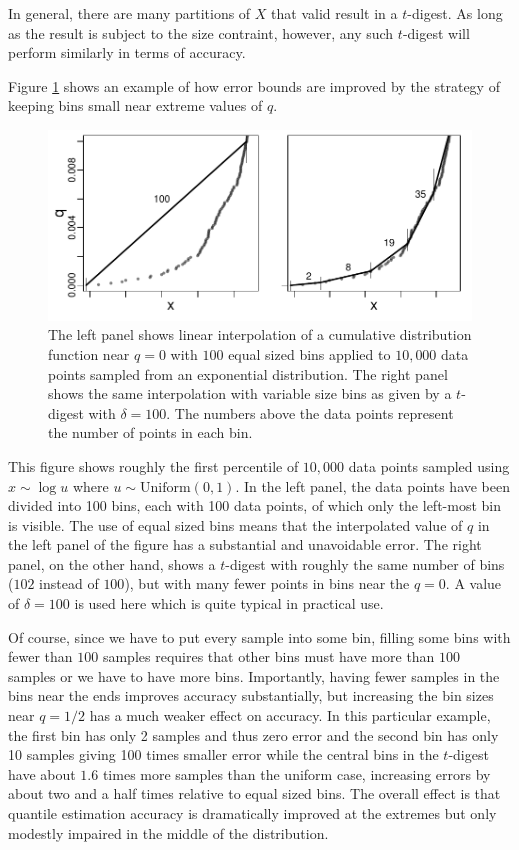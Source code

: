 \documentclass[11pt]{amsart}
\begin{document}
In general, there are many partitions of $X$ that valid result in a $t$-digest. As long as the result is subject to the size contraint, however, any such $t$-digest will perform similarly in terms of accuracy.

Figure \ref{fig:linear-interpolation} shows an example of how error bounds are improved by the strategy of keeping bins small near extreme values of $q$. 

\begin{figure}[h] %
   \centering
   \includegraphics[height=2.in, clip]{linear-interpolation.pdf} 
   \caption{The left panel shows linear interpolation of a cumulative distribution function near $q=0$ with $100$ equal sized bins applied to $10,000$ data points sampled from an exponential distribution. The right panel shows the same interpolation with variable size bins as given by a $t$-digest with $\delta=100$. The numbers above the data points represent the number of points in each bin. }
   \label{fig:linear-interpolation}
\end{figure}
This figure shows roughly the first percentile of $10,000$ data points sampled using $x \sim \log u$ where $u \sim \mathrm{Uniform}(0,1)$. In the left panel, the data points have been divided into 100 bins, each with 100 data points, of which only the left-most bin is visible. The use of equal sized bins means that the interpolated value of $q$ in the left panel of the figure has a substantial and unavoidable error. The right panel, on the other hand, shows a $t$-digest with roughly the same number of bins ($102$ instead of $100$), but with many fewer points in bins near the $q=0$. A value of $\delta=100$ is used here which is quite typical in practical use. 

Of course, since we have to put every sample into some bin, filling some bins with fewer than $100$ samples requires that other bins must have more than $100$ samples or we have to have more bins. Importantly, having fewer samples in the bins near the ends improves accuracy substantially, but increasing the bin sizes near $q=1/2$ has a much weaker effect on accuracy. In this particular example, the first bin has only 2 samples and thus zero error and the second bin has only 10 samples giving 100 times smaller error while the central bins in the $t$-digest have about $1.6$ times more samples than the uniform case, increasing errors by about two and a half times relative to equal sized bins. The overall effect is that quantile estimation accuracy is dramatically improved at the extremes but only modestly impaired in the middle of the distribution.
\end{document}

